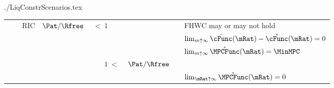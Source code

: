 \documentclass[titlepage,abstract]{bejournal}
\begin{document}
\begin{verbatimwrite}{./LiqConstrScenarios.tex}
\begin{table}[b]
\begin{center}
{\begin{tabular}{|l|rcl|l|}
\\ ~~~~RIC            & $        {\Pat/\Rfree}$  & $      {~<~}1\phantom{~<~}$ & $\phantom{\Pat/\PGro}$   & ~~FHWC may or may not hold
\\ ~~~~               &                          &                             &                          & ~~$\lim_{m \uparrow \infty}\bar{\cFunc}(\mRat) - \mathring{\cFunc}(\mRat) = 0$ %
\\ ~~~~               &                          &                             &                          & ~~$\lim_{m \uparrow \infty}\mathring{\MPCFunc}(\mRat) = \MinMPC$ %
\\ ~~~~\cancel{RIC}   &                          & $\phantom{~<~}1         ~<~ $ & $         \Pat/\Rfree$ & ~~\cancel{FHWC}
\\ ~~~~~~             &                          &                             &                          &~~$\lim_{\mRat \uparrow \infty} \mathring{\MPCFunc}(\mRat) =  0$               %
\\ \hline
\end{tabular}
} %


\end{center}
\end{table}
\end{verbatimwrite}
\end{document}
